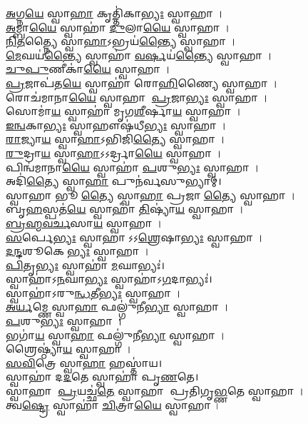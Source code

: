 \ul{𑌅}𑌗𑍍𑌨\ul{𑌯𑍇} 𑌸𑍍𑌵𑌾\ul{𑌹𑌾} 𑌕𑍃𑌤𑍍𑌤𑌿॑𑌕𑌾\ul{𑌭𑍍𑌯𑌃} 𑌸𑍍𑌵𑌾𑌹𑌾।\\
\ul{𑌅}𑌮𑍍𑌬𑌾\ul{𑌯𑍈} 𑌸𑍍𑌵𑌾𑌹𑌾॑ \ul{𑌦𑍁}𑌲𑌾\ul{𑌯𑍈} 𑌸𑍍𑌵𑌾𑌹𑌾।\\
\ul{𑌨𑌿}\ul{𑌤}𑌤𑍍𑌨𑍍𑌯𑍈 𑌸𑍍𑌵𑌾\ul{𑌹𑌾}𑌽𑌭𑍍𑌰𑌯॑\ul{𑌨𑍍𑌤𑍍𑌯𑍈} 𑌸𑍍𑌵𑌾𑌹𑌾।\\
\ul{𑌮𑍇}𑌘𑌯॑\ul{𑌨𑍍𑌤𑍍𑌯𑍈} 𑌸𑍍𑌵𑌾𑌹𑌾॑ \ul{𑌵}\ul{𑌰𑍍𑌷}𑌯॑\ul{𑌨𑍍𑌤𑍍𑌯𑍈} 𑌸𑍍𑌵𑌾𑌹𑌾।\\
\ul{𑌚𑍁}\ul{𑌪𑍁}𑌣𑍀𑌕𑌾॑\ul{𑌯𑍈} 𑌸𑍍𑌵𑌾𑌹𑌾।\\
\ul{𑌪𑍍𑌰}𑌜𑌾𑌪॑𑌤\ul{𑌯𑍇} 𑌸𑍍𑌵𑌾𑌹𑌾॑ 𑌰𑍋\ul{𑌹𑌿}𑌣𑍍𑌯𑍈 𑌸𑍍𑌵𑌾𑌹𑌾।\\
𑌰𑍋𑌚॑𑌮𑌾𑌨𑌾\ul{𑌯𑍈} 𑌸𑍍𑌵𑌾𑌹𑌾 \ul{𑌪𑍍𑌰}𑌜𑌾\ul{𑌭𑍍𑌯𑌃} 𑌸𑍍𑌵𑌾𑌹𑌾।\\
𑌸𑍋𑌮𑌾॑\ul{𑌯} 𑌸𑍍𑌵𑌾𑌹𑌾॑ 𑌮𑍃𑌗\ul{𑌶𑍀}𑌰𑍍𑌷𑌾\ul{𑌯} 𑌸𑍍𑌵𑌾𑌹𑌾।\\
\ul{𑌇}\ul{𑌨𑍍𑌵}𑌕𑌾\ul{𑌭𑍍𑌯𑌃} 𑌸𑍍𑌵𑌾𑌹𑍗𑌷॑𑌧𑍀\ul{𑌭𑍍𑌯𑌃} 𑌸𑍍𑌵𑌾𑌹𑌾।\\
\ul{𑌰𑌾}𑌜𑍍𑌯𑌾\ul{𑌯} 𑌸𑍍𑌵𑌾\ul{𑌹𑌾}𑌽𑌭𑌿𑌜𑌿॑\ul{𑌤𑍍𑌯𑍈} 𑌸𑍍𑌵𑌾𑌹𑌾।\\
\ul{𑌰𑍁}𑌦𑍍𑌰𑌾\ul{𑌯} 𑌸𑍍𑌵𑌾\ul{𑌹𑌾}𑌽𑌽𑌰𑍍𑌦𑍍𑌰𑌾\ul{𑌯𑍈} 𑌸𑍍𑌵𑌾𑌹𑌾।\\
𑌪𑌿𑌨𑍍𑌵॑𑌮𑌾𑌨𑌾\ul{𑌯𑍈} 𑌸𑍍𑌵𑌾𑌹𑌾॑ \ul{𑌪}𑌶𑍁\ul{𑌭𑍍𑌯𑌃} 𑌸𑍍𑌵𑌾𑌹𑌾।\\
𑌅𑌦𑌿॑\ul{𑌤𑍍𑌯𑍈} 𑌸𑍍𑌵𑌾\ul{𑌹𑌾} 𑌪𑍁𑌨॑𑌰𑍍𑌵𑌸𑍁𑌭𑍍𑌯𑌾𑌮𑍍।\\
𑌸𑍍𑌵𑌾𑌹𑌾 𑌭𑍂\ul{𑌤𑍍𑌯𑍈} 𑌸𑍍𑌵𑌾\ul{𑌹𑌾} 𑌪𑍍𑌰𑌜𑌾\ul{𑌤𑍍𑌯𑍈} 𑌸𑍍𑌵𑌾𑌹𑌾।\\
𑌬𑍃\ul{𑌹}𑌸𑍍𑌪𑌤॑\ul{𑌯𑍇} 𑌸𑍍𑌵𑌾𑌹𑌾॑ \ul{𑌤𑌿}𑌷𑍍𑌯𑌾॑\ul{𑌯} 𑌸𑍍𑌵𑌾𑌹𑌾।\\
\ul{𑌬𑍍𑌰}\ul{𑌹𑍍𑌮}\ul{𑌵}\ul{𑌰𑍍𑌚}𑌸𑌾\ul{𑌯} 𑌸𑍍𑌵𑌾𑌹𑌾।\\
\ul{𑌸}𑌰𑍍𑌪𑍇\ul{𑌭𑍍𑌯𑌃} 𑌸𑍍𑌵𑌾𑌹𑌾𑌽𑌽\ul{𑌶𑍍𑌰𑍇}𑌷𑌾\ul{𑌭𑍍𑌯𑌃} 𑌸𑍍𑌵𑌾𑌹𑌾।\\
\ul{𑌦}\ul{𑌨𑍍𑌦}𑌶𑍂𑌕𑍇\ul{𑌭𑍍𑌯𑌃} 𑌸𑍍𑌵𑌾𑌹𑌾।\\
\ul{𑌪𑌿}𑌤𑍃\ul{𑌭𑍍𑌯𑌃} 𑌸𑍍𑌵𑌾𑌹𑌾॑ \ul{𑌮}𑌘𑌾𑌭𑍍𑌯𑌃॑।\\
𑌸𑍍𑌵𑌾𑌹𑌾॑𑌽\ul{𑌨}𑌘𑌾\ul{𑌭𑍍𑌯𑌃} 𑌸𑍍𑌵𑌾𑌹𑌾॑𑌽\ul{𑌗}𑌦𑌾𑌭𑍍𑌯𑌃॑।\\
𑌸𑍍𑌵𑌾𑌹𑌾॑𑌽𑌰𑍁\ul{𑌨𑍍𑌧}𑌤𑍀\ul{𑌭𑍍𑌯𑌃} 𑌸𑍍𑌵𑌾𑌹𑌾।\\
\ul{𑌅}\ul{𑌰𑍍𑌯}𑌮𑍍𑌣𑍇 𑌸𑍍𑌵𑌾\ul{𑌹𑌾} 𑌫𑌲𑍍𑌗𑍁॑𑌨𑍀\ul{𑌭𑍍𑌯𑌾}\ul{} 𑌸𑍍𑌵𑌾𑌹𑌾।\\
\ul{𑌪}𑌶𑍁\ul{𑌭𑍍𑌯𑌃} 𑌸𑍍𑌵𑌾𑌹𑌾।\\
𑌭𑌗𑌾॑\ul{𑌯} 𑌸𑍍𑌵𑌾\ul{𑌹𑌾} 𑌫𑌲𑍍𑌗𑍁॑𑌨𑍀\ul{𑌭𑍍𑌯𑌾}\ul{} 𑌸𑍍𑌵𑌾𑌹𑌾।\\
𑌶𑍍𑌰𑍈𑌷𑍍𑌠𑍍𑌯𑌾॑\ul{𑌯} 𑌸𑍍𑌵𑌾𑌹𑌾।\\
\ul{𑌸}\ul{𑌵𑌿}𑌤𑍍𑌰𑍇 𑌸𑍍𑌵𑌾\ul{𑌹𑌾} 𑌹𑌸𑍍𑌤𑌾॑𑌯।\\
𑌸𑍍𑌵𑌾𑌹𑌾॑ 𑌦\ul{𑌦}𑌤𑍇 𑌸𑍍𑌵𑌾𑌹𑌾॑ 𑌪𑍃\ul{𑌣}𑌤𑍇।\\
𑌸𑍍𑌵𑌾𑌹𑌾 \ul{𑌪𑍍𑌰}𑌯𑌚𑍍𑌛॑\ul{𑌤𑍇} 𑌸𑍍𑌵𑌾𑌹𑌾 𑌪𑍍𑌰𑌤𑌿𑌗𑍃\ul{𑌭𑍍𑌣}𑌤𑍇 𑌸𑍍𑌵𑌾𑌹𑌾।\\
𑌤𑍍𑌵\ul{𑌷𑍍𑌟𑍍𑌰𑍇} 𑌸𑍍𑌵𑌾𑌹𑌾॑ \ul{𑌚𑌿}𑌤𑍍𑌰𑌾\ul{𑌯𑍈} 𑌸𑍍𑌵𑌾𑌹𑌾।\\

